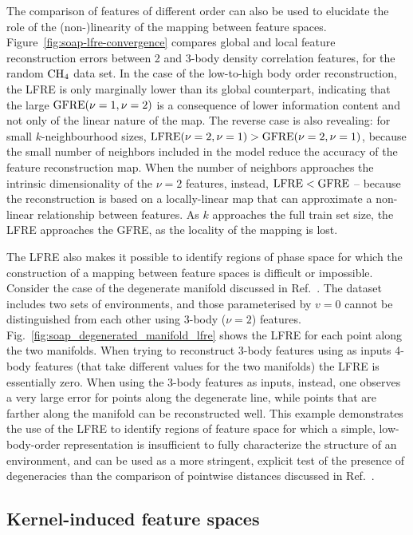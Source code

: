 The comparison of features of different order can also be used to elucidate the role of the (non-)linearity of the mapping between feature spaces. Figure~\ref{fig:soap-lfre-convergence} compares global and local feature reconstruction errors between 2 and 3-body density correlation features, for the random $\ce{CH4}$ data set. In the case of the low-to-high body order reconstruction, the LFRE is only marginally lower than its global counterpart, indicating that the large $\operatorname{GFRE}(\nu=1,\nu=2)$ is a consequence of lower information content and not only of the linear nature of the map. The reverse case is also revealing: for small $k$-neighbourhood sizes, $\operatorname{LFRE}(\nu=2,\nu=1)>\operatorname{GFRE}(\nu=2,\nu=1)$, because the small number of neighbors included in the model reduce the accuracy of the feature reconstruction map. When the number of neighbors approaches the intrinsic dimensionality of the $\nu=2$ features, instead, $\operatorname{LFRE}<\operatorname{GFRE}$ -- because the reconstruction is based on a locally-linear map that can approximate a non-linear relationship between features. As $k$ approaches the full train set size, the LFRE approaches the GFRE, as the locality of the mapping is lost. 

The LFRE also makes it possible to identify regions of phase space for which the construction of a mapping between feature spaces is difficult or impossible. 
Consider the case of the degenerate manifold discussed in Ref.~. The dataset includes two sets of  environments, and those parameterised by $v=0$ cannot be distinguished from each other using 3-body ($\nu=2$) features.
Fig.~\ref{fig:soap_degenerated_manifold_lfre} shows the LFRE for each point along the two manifolds. When trying to reconstruct 3-body features using as inputs 4-body features (that take different values for the two manifolds) the LFRE is essentially zero. When using the 3-body features as inputs, instead, one observes a very large error for points along the degenerate line, while points that are farther along the manifold can be reconstructed well. This example demonstrates the use of the LFRE to identify regions of feature space for which a simple, low-body-order representation is insufficient to fully characterize the structure of an environment, and can be used as a more stringent, explicit test of the presence of degeneracies than the comparison of pointwise distances discussed in Ref.~. 

\subsection{Kernel-induced feature spaces}

